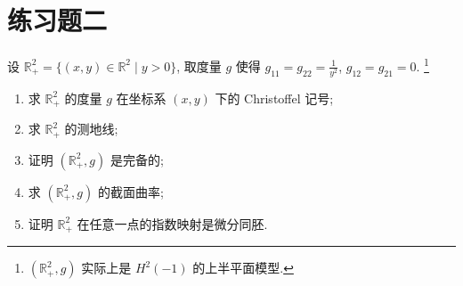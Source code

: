 \section{练习题二}



\begin{exercise}[5]
  设 $\mathbb{R}_+^2=\{(x,y)\in\mathbb{R}^2 \mid y>0\}$,
  取度量 $g$ 使得 $g_{11}=g_{22}=\frac{1}{y^2}$, $g_{12}=g_{21}=0$.
  \footnote{$(\mathbb{R}^2_+,g)$ 实际上是 $H^2(-1)$ 的上半平面模型.}
  \begin{enumerate}[(1)]
    \item 求 $\mathbb{R}_+^2$ 的度量 $g$ 在坐标系 $(x,y)$ 下的 Christoffel 记号;
    \item 求 $\mathbb{R}_+^2$ 的测地线;
    \item 证明 $(\mathbb{R}^2_+,g)$ 是完备的;
    \item 求 $(\mathbb{R}^2_+,g)$ 的截面曲率;
    \item 证明 $\mathbb{R}^2_+$ 在任意一点的指数映射是微分同胚.
  \end{enumerate}
\end{exercise}

